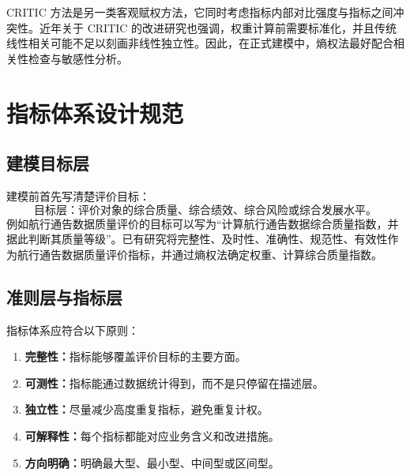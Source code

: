 \documentclass[UTF8,zihao=-4]{ctexart}
\begin{document}
CRITIC 方法是另一类客观赋权方法，它同时考虑指标内部对比强度与指标之间冲突性\cite{diakoulaki1995critic}。近年关于 CRITIC 的改进研究也强调，权重计算前需要标准化，并且传统线性相关可能不足以刻画非线性独立性\cite{zhang2024critid}。因此，在正式建模中，熵权法最好配合相关性检查与敏感性分析。

\section{指标体系设计规范}

\subsection{建模目标层}
建模前首先写清楚评价目标：
\begin{equation}
\text{目标层：评价对象的综合质量、综合绩效、综合风险或综合发展水平。}
\end{equation}
例如航行通告数据质量评价的目标可以写为“计算航行通告数据综合质量指数，并据此判断其质量等级”。已有研究将完整性、及时性、准确性、规范性、有效性作为航行通告数据质量评价指标，并通过熵权法确定权重、计算综合质量指数\cite{li2022notam}。

\subsection{准则层与指标层}
指标体系应符合以下原则：
\begin{enumerate}
  \item \textbf{完整性：}指标能够覆盖评价目标的主要方面。
  \item \textbf{可测性：}指标能通过数据统计得到，而不是只停留在描述层。
  \item \textbf{独立性：}尽量减少高度重复指标，避免重复计权。
  \item \textbf{可解释性：}每个指标都能对应业务含义和改进措施。
  \item \textbf{方向明确：}明确最大型、最小型、中间型或区间型。
\end{enumerate}
\end{document}
